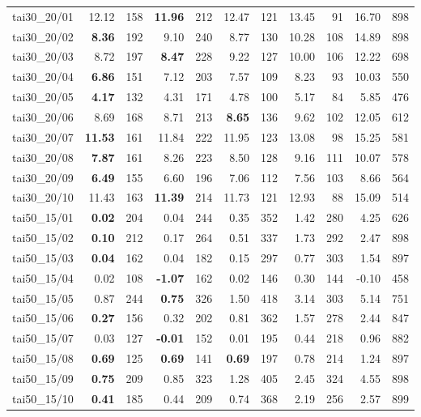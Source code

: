 \begin{longtable}{l | rr | rr | rr | rr | rr}
\hline
tai30_20/01    & 12.12 & 158 & \textbf{11.96} & 212 & 12.47 & 121 & 13.45 & 91 & 16.70 & 898 \\
tai30_20/02    & \textbf{8.36} & 192 & 9.10 & 240 & 8.77 & 130 & 10.28 & 108 & 14.89 & 898 \\
tai30_20/03    & 8.72 & 197 & \textbf{8.47} & 228 & 9.22 & 127 & 10.00 & 106 & 12.22 & 698 \\
tai30_20/04    & \textbf{6.86} & 151 & 7.12 & 203 & 7.57 & 109 & 8.23 & 93 & 10.03 & 550 \\
tai30_20/05    & \textbf{4.17} & 132 & 4.31 & 171 & 4.78 & 100 & 5.17 & 84 & 5.85 & 476 \\
tai30_20/06    & 8.69 & 168 & 8.71 & 213 & \textbf{8.65} & 136 & 9.62 & 102 & 12.05 & 612 \\
tai30_20/07    & \textbf{11.53} & 161 & 11.84 & 222 & 11.95 & 123 & 13.08 & 98 & 15.25 & 581 \\
tai30_20/08    & \textbf{7.87} & 161 & 8.26 & 223 & 8.50 & 128 & 9.16 & 111 & 10.07 & 578 \\
tai30_20/09    & \textbf{6.49} & 155 & 6.60 & 196 & 7.06 & 112 & 7.56 & 103 & 8.66 & 564 \\
tai30_20/10    & 11.43 & 163 & \textbf{11.39} & 214 & 11.73 & 121 & 12.93 & 88 & 15.09 & 514 \\
\hline
tai50_15/01    & \textbf{0.02} & 204 & 0.04 & 244 & 0.35 & 352 & 1.42 & 280 & 4.25 & 626 \\
tai50_15/02    & \textbf{0.10} & 212 & 0.17 & 264 & 0.51 & 337 & 1.73 & 292 & 2.47 & 898 \\
tai50_15/03    & \textbf{0.04} & 162 & 0.04 & 182 & 0.15 & 297 & 0.77 & 303 & 1.54 & 897 \\
tai50_15/04    & 0.02 & 108 & \textbf{-1.07} & 162 & 0.02 & 146 & 0.30 & 144 & -0.10 & 458 \\
tai50_15/05    & 0.87 & 244 & \textbf{0.75} & 326 & 1.50 & 418 & 3.14 & 303 & 5.14 & 751 \\
tai50_15/06    & \textbf{0.27} & 156 & 0.32 & 202 & 0.81 & 362 & 1.57 & 278 & 2.44 & 847 \\
tai50_15/07    & 0.03 & 127 & \textbf{-0.01} & 152 & 0.01 & 195 & 0.44 & 218 & 0.96 & 882 \\
tai50_15/08    & \textbf{0.69} & 125 & \textbf{0.69} & 141 & \textbf{0.69} & 197 & 0.78 & 214 & 1.24 & 897 \\
tai50_15/09    & \textbf{0.75} & 209 & 0.85 & 323 & 1.28 & 405 & 2.45 & 324 & 4.55 & 898 \\
tai50_15/10    & \textbf{0.41} & 185 & 0.44 & 209 & 0.74 & 368 & 2.19 & 256 & 2.57 & 899 \\

\end{longtable}
